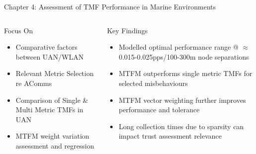 \documentclass[aspectratio=43]{beamer}
\begin{document}
\begin{frame}{Chapter 4: Assessment of TMF Performance in Marine Environments}
  \begin{columns}
    \begin{column}{0.5\textwidth}
      \begin{block}{Focus On}
        \begin{itemize}
          \item Comparative factors between UAN/WLAN
	      \item Relevant Metric Selection re AComms
          \item Comparison of Single \& Multi Metric TMFs in UAN
          \item MTFM weight variation assessment and regression
        \end{itemize}
      \end{block}
    \end{column}
    \begin{column}{0.5\textwidth}
      \begin{exampleblock}{Key Findings}
        \begin{itemize}
          \item Modelled optimal performance range @ $\approx$0.015-0.025pps/100-300m node separations \hyperlink{fig:2d_normed_product}{}
          \item MTFM outperforms single metric TMFs for selected misbehaviours \hyperlink{fig:otmf_beta_comparison_boxes}{}
          \item MTFM vector weighting further improves performance and tolerance \hyperlink{fig:all_mobile_badmouthing}{}
          \item Long collection times due to sparsity can impact trust assessment relevance

        \end{itemize}
      \end{exampleblock}
    \end{column}
  \end{columns}

\end{frame}
\end{document}
